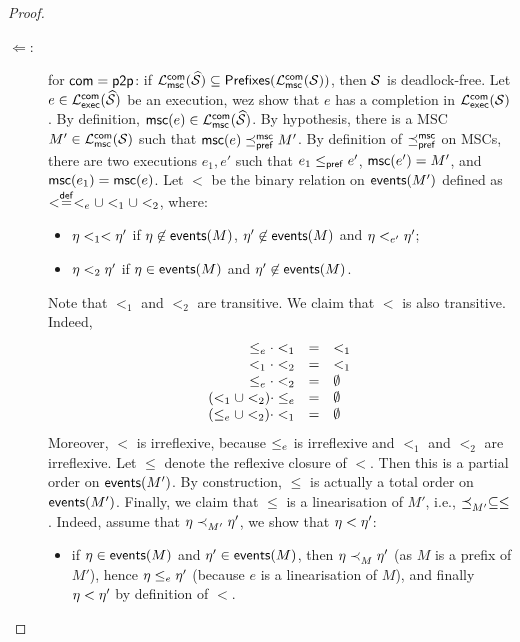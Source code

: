 \begin{proof}
\begin{description}
        \item[$\Leftarrow$:] for  $\mathsf{com}=\mathsf{p2p}$:
        if  
        $\mathcal{L}_{\mathsf{msc}}^{\mathsf{com}}(\widehat{\mathcal{S}})\subseteq
        \mathsf{Prefixes}(\mathcal{L}_{\mathsf{msc}}^{\mathsf{com}}(\mathcal{S}))$,
        then $\mathcal{S}$ is deadlock-free.
        Let $e\in\mathcal{L}_{\mathsf{exec}}^{\mathsf{com}}(\widehat{\mathcal{S}})$ be an execution,
        wez show that $e$ has a completion in $\mathcal{L}_{\mathsf{exec}}^{\mathsf{com}}(\mathcal{S})$.
        By definition, $\mathsf{msc}(e)\in\mathcal{L}_{\mathsf{msc}}^{\mathsf{com}}(\widehat{\mathcal{S}})$.
        By hypothesis, there is a MSC $M'\in\mathcal{L}_{\mathsf{msc}}^{\mathsf{com}}(\mathcal{S})$
        such that $\mathsf{msc}(e)\mathrel{\preceq_{\mathsf{pref}}^{\mathsf{msc}}}M'$. By definition of $\mathrel{\preceq_{\mathsf{pref}}^{\mathsf{msc}}}$ on MSCs,
        there are two executions $e_1,e'$ such that 
        $e_1\mathrel{\leq_{\mathsf{pref}}} e'$, $\mathsf{msc}(e')=M'$, 
        and $\mathsf{msc}(e_1)=\mathsf{msc}(e)$.
        Let $<$ be the binary relation on $\mathsf{events}(M')$ 
        defined as $< \stackrel{\mathsf{def}}{=} \mathrel{<_{e}}\cup <_1\cup <_2$, where:
        \begin{itemize}
            \item $\eta <_1<\eta'$ if $\eta\not\in\mathsf{events}(M)$,
            $\eta'\not\in\mathsf{events}(M)$ and $\eta <_{e'} \eta'$;
            \item $\eta <_2\eta'$ if $\eta\in\mathsf{events}(M)$ and $\eta'\not\in\mathsf{events}(M)$.
        \end{itemize}
        Note that $<_1$ and $<_2$ are transitive. We claim that $<$
        is also transitive. Indeed, 
        $$
        \begin{array}{rcl}
           \mathrel{\leq_{e}}\cdot <_1 & = & <_1\\
            <_1\cdot <_2 & = & <_1 \\
            \mathrel{\leq_{e}}\cdot<_2 & = & \emptyset \\
            (<_1\cup <_2)\cdot \mathrel{\leq_{e}} & = & \emptyset \\
            (\mathrel{\leq_{e}}\cup <_2)\cdot <_1 & = & \emptyset \\
        \end{array}
        $$
        Moreover, $<$ is irreflexive, because $\mathrel{\leq_{e}}$ is irreflexive and $<_1$ and $<_2$ are irreflexive.
        Let $\leq$ denote the reflexive closure of $<$.
        Then this is a partial order on $\mathsf{events}(M')$.
        By construction, $\leq$ is actually a total order on $\mathsf{events}(M')$.       
        Finally, we claim that $\leq$ is a linearisation of $M'$, i.e., $\mathrel{\preceq_{M'}^{}}\subseteq \leq$.
        Indeed, assume that $\eta\mathrel{\prec_{M'}^{}}\eta'$, we show that $\eta< \eta'$:
        \begin{itemize}
            \item if $\eta\in\mathsf{events}(M)$ and $\eta'\in\mathsf{events}(M)$,
            then $\eta\mathrel{\prec_{M}^{}} \eta'$ (as $M$ is a prefix of $M'$), hence $\eta\mathrel{\leq_{e}} \eta'$ 
            (because $e$ is a linearisation of $M$),
            and finally $\eta < \eta'$ by definition of $<$.
            

\end{itemize}
\end{description}
\end{proof}
